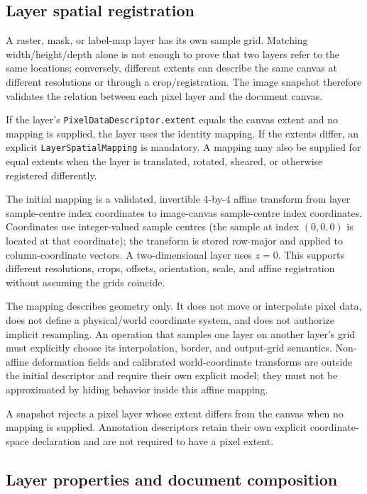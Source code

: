\documentclass[11pt,a4paper,oneside]{article}
\begin{document}
\subsection{Layer spatial registration}

A raster, mask, or label-map layer has its own sample grid. Matching width/height/depth alone is not enough to prove that two layers refer to the same locations; conversely, different extents can describe the same canvas at different resolutions or through a crop/registration. The image snapshot therefore validates the relation between each pixel layer and the document canvas.

If the layer's \texttt{PixelDataDescriptor.extent} equals the canvas extent and no mapping is supplied, the layer uses the identity mapping. If the extents differ, an explicit \texttt{LayerSpatialMapping} is mandatory. A mapping may also be supplied for equal extents when the layer is translated, rotated, sheared, or otherwise registered differently.

The initial mapping is a validated, invertible 4-by-4 affine transform from layer sample-centre index coordinates to image-canvas sample-centre index coordinates. Coordinates use integer-valued sample centres (the sample at index $(0,0,0)$ is located at that coordinate); the transform is stored row-major and applied to column-coordinate vectors. A two-dimensional layer uses $z=0$. This supports different resolutions, crops, offsets, orientation, scale, and affine registration without assuming the grids coincide.

The mapping describes geometry only. It does not move or interpolate pixel data, does not define a physical/world coordinate system, and does not authorize implicit resampling. An operation that samples one layer on another layer's grid must explicitly choose its interpolation, border, and output-grid semantics. Non-affine deformation fields and calibrated world-coordinate transforms are outside the initial descriptor and require their own explicit model; they must not be approximated by hiding behavior inside this affine mapping.

A snapshot rejects a pixel layer whose extent differs from the canvas when no mapping is supplied. Annotation descriptors retain their own explicit coordinate-space declaration and are not required to have a pixel extent.

\subsection{Layer properties and document composition}
\end{document}
